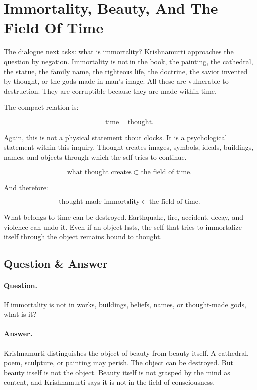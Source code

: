 \section{Immortality, Beauty, And The Field Of Time}

The dialogue next asks: what is immortality? Krishnamurti approaches the question by negation. Immortality is not in the book, the painting, the cathedral, the statue, the family name, the righteous life, the doctrine, the savior invented by thought, or the gods made in man's image. All these are vulnerable to destruction. They are corruptible because they are made within time.

The compact relation is:

\begin{equation}
\text{time} = \text{thought}.
\end{equation}

Again, this is not a physical statement about clocks. It is a psychological statement within this inquiry. Thought creates images, symbols, ideals, buildings, names, and objects through which the self tries to continue.

\begin{equation}
\text{what thought creates}
\subset
\text{the field of time}.
\end{equation}

And therefore:

\begin{equation}
\text{thought-made immortality}
\subset
\text{the field of time}.
\end{equation}

What belongs to time can be destroyed. Earthquake, fire, accident, decay, and violence can undo it. Even if an object lasts, the self that tries to immortalize itself through the object remains bound to thought.

\subsection{Question \& Answer}

\paragraph{Question.}
If immortality is not in works, buildings, beliefs, names, or thought-made gods, what is it?

\paragraph{Answer.}
Krishnamurti distinguishes the object of beauty from beauty itself. A cathedral, poem, sculpture, or painting may perish. The object can be destroyed. But beauty itself is not the object. Beauty itself is not grasped by the mind as content, and Krishnamurti says it is not in the field of consciousness.

